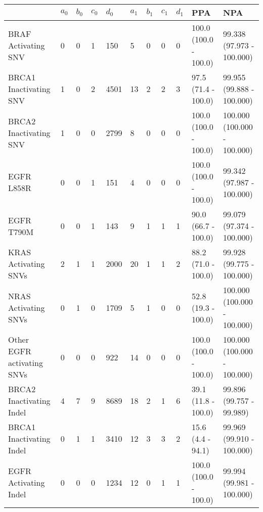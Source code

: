 \begin{tabular}{|l|l|l|l|l|l|l|l|l|l|l|}
\hline
\rowcolor[gray]{.85}{}                           & \textbf{$a_0$} & \textbf{$b_0$} & \textbf{$c_0$} & \textbf{$d_0$} & \textbf{$a_1$} & \textbf{$b_1$} & \textbf{$c_1$} & \textbf{$d_1$} & \textbf{PPA} & \textbf{                          NPA }\\ \hline
BRAF Activating SNV         &      0 &      0 &      1 &    150 &      5 &      0 &      0 &      0 &  100.0 (100.0 - 100.0) &    99.338 (97.973 - 100.000) \\ \hline
BRCA1 Inactivating SNV      &      1 &      0 &      2 &   4501 &     13 &      2 &      2 &      3 &    97.5 (71.4 - 100.0) &    99.955 (99.888 - 100.000) \\ \hline
BRCA2 Inactivating SNV      &      1 &      0 &      0 &   2799 &      8 &      0 &      0 &      0 &  100.0 (100.0 - 100.0) &  100.000 (100.000 - 100.000) \\ \hline
EGFR L858R                  &      0 &      0 &      1 &    151 &      4 &      0 &      0 &      0 &  100.0 (100.0 - 100.0) &    99.342 (97.987 - 100.000) \\ \hline
EGFR T790M                  &      0 &      0 &      1 &    143 &      9 &      1 &      1 &      1 &    90.0 (66.7 - 100.0) &    99.079 (97.374 - 100.000) \\ \hline
KRAS Activating SNVs        &      2 &      1 &      1 &   2000 &     20 &      1 &      1 &      2 &    88.2 (71.0 - 100.0) &    99.928 (99.775 - 100.000) \\ \hline
NRAS Activating SNVs        &      0 &      1 &      0 &   1709 &      5 &      1 &      0 &      0 &    52.8 (19.3 - 100.0) &  100.000 (100.000 - 100.000) \\ \hline
Other EGFR activating SNVs  &      0 &      0 &      0 &    922 &     14 &      0 &      0 &      0 &  100.0 (100.0 - 100.0) &  100.000 (100.000 - 100.000) \\ \hline
BRCA2 Inactivating Indel    &      4 &      7 &      9 &   8689 &     18 &      2 &      1 &      6 &    39.1 (11.8 - 100.0) &     99.896 (99.757 - 99.989) \\ \hline
BRCA1 Inactivating Indel    &      0 &      1 &      1 &   3410 &     12 &      3 &      3 &      2 &      15.6 (4.4 - 94.1) &    99.969 (99.910 - 100.000) \\ \hline
EGFR Activating Indel       &      0 &      0 &      0 &   1234 &     12 &      0 &      1 &      1 &  100.0 (100.0 - 100.0) &    99.994 (99.981 - 100.000) \\ \hline

\end{tabular}

